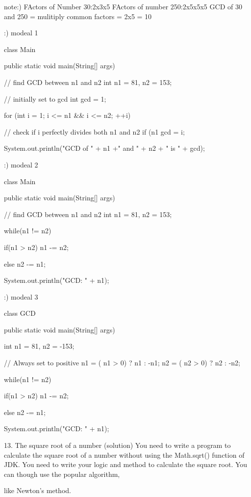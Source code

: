  
 note:)  FActors of Number 30:2x3x5
		 FActors of number 250:2x5x5x5
		 GCD of 30 and 250 = mulitiply common factors
		                   = 2x5
						   = 10
 
 
 
 :) modeal 1
 
	class Main {
  public static void main(String[] args) {

    // find GCD between n1 and n2
    int n1 = 81, n2 = 153;
    
    // initially set to gcd
    int gcd = 1;

    for (int i = 1; i <= n1 && i <= n2; ++i) {

      // check if i perfectly divides both n1 and n2
      if (n1 %
        gcd = i;
    }

    System.out.println("GCD of " + n1 +" and " + n2 + " is " + gcd);
  }
}
 
 :) modeal 2
 
 class Main {
  public static void main(String[] args) {

    // find GCD between n1 and n2
    int n1 = 81, n2 = 153;
    
    while(n1 != n2) {
    
      if(n1 > n2) {
        n1 -= n2;
      }
      
      else {
        n2 -= n1;
      }
    }

    System.out.println("GCD: " + n1);
  }
}
 
 :) modeal 3
 
 class GCD {
  public static void main(String[] args) {

    int n1 = 81, n2 = -153;

    // Always set to positive
    n1 = ( n1 > 0) ? n1 : -n1;
    n2 = ( n2 > 0) ? n2 : -n2;

    while(n1 != n2) {
        
      if(n1 > n2) {
        n1 -= n2;
      }
      
      else {
        n2 -= n1;
      }
    }
    
    System.out.println("GCD: " + n1);
  }
}


13. The square root of a number (solution)
You need to write a program to calculate the square root of a number without using the Math.sqrt() function of JDK. 
You need to write your logic and method to calculate the square root. You can though use the popular algorithm,

 like Newton's method.

